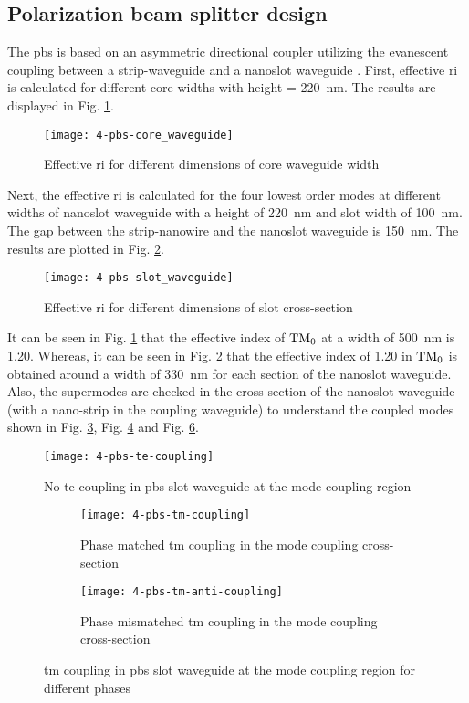 \documentclass[../report.tex]{subfiles}
\begin{document}
\subsection{Polarization beam splitter design}
The \gls{pbs} is based on an asymmetric directional coupler utilizing the evanescent coupling between a strip-waveguide and a nanoslot waveguide \cite{pbs_dai_2011}. First, effective \gls{ri} is calculated for different core widths with height = \SI{220}{\nano \meter}. The results are displayed in Fig. \ref{fig:4_pbs_core_waveguide}.
\begin{figure}[H] %
	\centering
	\texttt{[image: 4-pbs-core\_waveguide]}
	\caption{Effective \gls{ri} for different dimensions of core waveguide width}
	\label{fig:4_pbs_core_waveguide}
\end{figure}
\noindent Next, the effective \gls{ri} is calculated for the four lowest order modes at different widths of nanoslot waveguide with a height of \SI{220}{\nano \meter} and slot width of \SI{100}{\nano \meter}. The gap between the strip-nanowire and the nanoslot waveguide is \SI{150}{\nano \meter}. The results are plotted in Fig. \ref{fig:4_pbs_slot_waveguide}.
\begin{figure}[H] %
	\centering
	\texttt{[image: 4-pbs-slot\_waveguide]}
	\caption{Effective \gls{ri} for different dimensions of slot cross-section}
	\label{fig:4_pbs_slot_waveguide}
\end{figure}
\noindent It can be seen in Fig. \ref{fig:4_pbs_core_waveguide} that the effective index of $\mathrm{TM_0}$ at a width of \SI{500}{\nano \meter} is 1.20. Whereas, it can be seen in Fig. \ref{fig:4_pbs_slot_waveguide} that the effective index of 1.20 in $\mathrm{TM_0}$ is obtained around a width of \SI{330}{\nano \meter} for each section of the nanoslot waveguide. Also, the supermodes are checked in the cross-section of the nanoslot waveguide (with a nano-strip in the coupling waveguide) to understand the coupled modes shown in Fig. \ref{fig:4_pbs_te_coupling}, Fig. \ref{fig:4_pbs_tm_coupling} and Fig. \ref{fig:4-pbs-tm-anti-coupling}.
\begin{figure}[H] %
	\centering
	\texttt{[image: 4-pbs-te-coupling]}
	\caption{No \gls{te} coupling in \gls{pbs} slot waveguide at the mode coupling region}
	\label{fig:4_pbs_te_coupling}
\end{figure}

\begin{figure}[H] %
	\begin{subfigure}[t]{0.45\textwidth}
		\texttt{[image: 4-pbs-tm-coupling]}
		\caption{Phase matched \gls{tm} coupling in the mode coupling cross-section}
		\label{fig:4_pbs_tm_coupling}
	\end{subfigure}
	\hfill
	\begin{subfigure}[t]{0.45\textwidth}
		\texttt{[image: 4-pbs-tm-anti-coupling]}
		\caption{Phase mismatched \gls{tm} coupling in the mode coupling cross-section}
		\label{fig:4-pbs-tm-anti-coupling}
	\end{subfigure}	
	\caption{\gls{tm} coupling in \gls{pbs} slot waveguide at the mode coupling region for different phases}
\end{figure}
\end{document}
